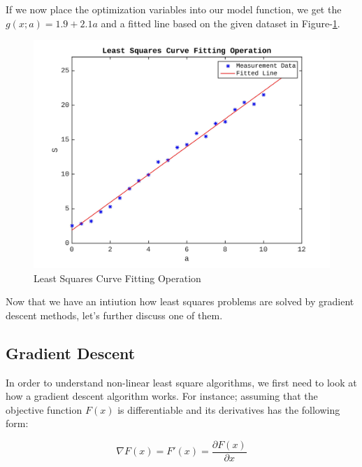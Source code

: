 \documentclass[a4paper]{report}
\numberwithin{figure}{section}
\begin{document}
If we now place the optimization variables into our model function, we
get the $g(x;a)=1.9+2.1a$ and a fitted line based on the given
dataset in
Figure-\ref{fig:lsq_curve_fit_operation}.

\begin{figure}[H]
	\centering
	\includegraphics[width=\linewidth,natwidth=640,natheight=640]
	{fig/lsq_curve_fit_operation_v2.jpg}
	\caption{Least Squares Curve Fitting Operation}
	\label{fig:lsq_curve_fit_operation}
\end{figure}

Now that we have an intiution how least squares problems are solved 
by gradient descent methods, let's further discuss one of them.

\subsection{Gradient Descent}

In order to understand non-linear least square algorithms, 
we first need to look at how a gradient descent algorithm works. For instance; 
assuming that the objective function $F(x)$ is differentiable and its 
derivatives has the following form:

\begin{equation}
  \nabla F(x) = F'(x) = \frac{\partial F(x)}{\partial x}
\end{equation}
\end{document}
